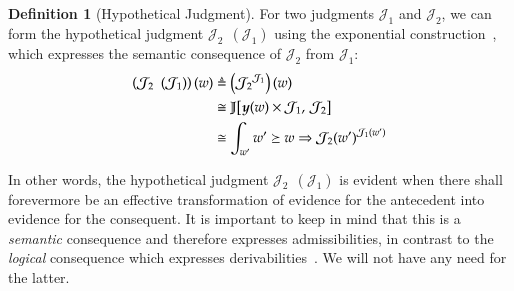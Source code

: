 \documentclass[11pt]{article}
\theoremstyle{definition}
\newtheorem{definition}[thm]{Definition}
\theoremstyle{remark}
\numberwithin{equation}{section}
\def\IModeColorName{MidnightBlue}
\def\OModeColorName{Maroon}
\def\IModeColorName{Black}
\def\OModeColorName{Black}
\newcommand\IMode[1]{{\color{\IModeColorName}{#1}}}
\newcommand\OMode[1]{{\color{\OModeColorName}{#1}}}
\newcommand\HypJ[2]{#1\ \ (#2)}
\newcommand\Hom[3]{#1\!\left[#2,\,#3\right]\!}
\newcommand\ADefine[2]{\IMode{#1}&\triangleq\OMode{#2}}
\newcommand\Yoneda[1]{\boldsymbol{y} (#1)}
\begin{document}
\begin{definition}[Hypothetical Judgment]
  For two judgments $\mathcal{J}_1$ and $\mathcal{J}_2$, we can form the
  hypothetical judgment $\HypJ{\mathcal{J}_2}{\mathcal{J}_1}$ using the
  exponential construction~\cite[p.~46]{maclane-moerdijk:1992}, which expresses the semantic consequence
  of $\mathcal{J}_2$ from $\mathcal{J}_1$:
  \begin{align*}
    \ADefine{
      \left(\HypJ{\mathcal{J}_2}{\mathcal{J}_1}\right)(w)
    }{
      \left({\mathcal{J}_2}^{\mathcal{J}_1}\right)(w)
    }\\
    &\cong
    \OMode{
      \Hom{\mathbb{J}}{
        \Yoneda{w}\times\mathcal{J}_1
      }{
        \mathcal{J}_2
      }
    }\\
    &\cong
    \OMode{
      \int_{w'}{{{w'}\succeq{w}}\Rightarrow{{{\mathcal{J}}_{2}(w')}^{{\mathcal{J}}_{1}(w')}}}
    }
  \end{align*}

  In other words, the hypothetical judgment
  $\HypJ{\mathcal{J}_2}{\mathcal{J}_1}$ is evident when there shall forevermore
  be an effective transformation of evidence for the antecedent into evidence
  for the consequent. It is important to keep in mind that this is a
  \emph{semantic} consequence and therefore expresses admissibilities, in
  contrast to the \emph{logical} consequence which expresses
  derivabilities~\cite{harper:2016}. We will not have any need for the latter.
\end{definition}
\end{document}
